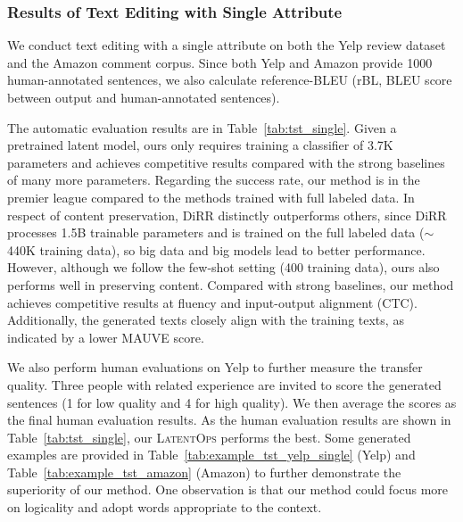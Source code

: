 \documentclass[11pt]{article}
\begin{document}
\subsubsection{Results of Text Editing with Single Attribute}
\label{app:example_text_edit_single}
We conduct text editing with a single attribute on both the Yelp review dataset and the Amazon comment corpus. Since both Yelp and Amazon provide 1000 human-annotated sentences, we also calculate reference-BLEU (rBL, BLEU score between output and human-annotated sentences). 

The automatic evaluation results are in Table~\ref{tab:tst_single}. 
Given a pretrained latent model, ours only requires training a classifier of 3.7K parameters and achieves competitive results compared with the strong baselines of many more parameters.  
Regarding the success rate, our method is in the premier league compared to the methods trained with full labeled data. In respect of content preservation, DiRR distinctly outperforms others, since DiRR processes 1.5B trainable parameters and is trained on the full labeled data ($\sim$440K training data), so big data and big models lead to better performance. However, although we follow the few-shot setting (400 training data), ours also performs well in preserving content. Compared with strong baselines, our method achieves competitive results at fluency and input-output alignment (CTC). Additionally, the generated texts closely align with the training texts, as indicated by a lower MAUVE score.

We also perform human evaluations on Yelp to further measure the transfer quality. 
Three people with related experience are invited to score the generated sentences (1 for low quality and 4 for high quality). We then average the scores as the final human evaluation results.
As the human evaluation results are shown in Table~\ref{tab:tst_single}, our \textsc{LatentOps} performs the best.
Some generated examples are provided in Table~\ref{tab:example_tst_yelp_single} (Yelp) and Table~\ref{tab:example_tst_amazon} (Amazon) to further demonstrate the superiority of our method.  One observation is that our method could focus more on logicality and adopt words appropriate to the context.
\end{document}
